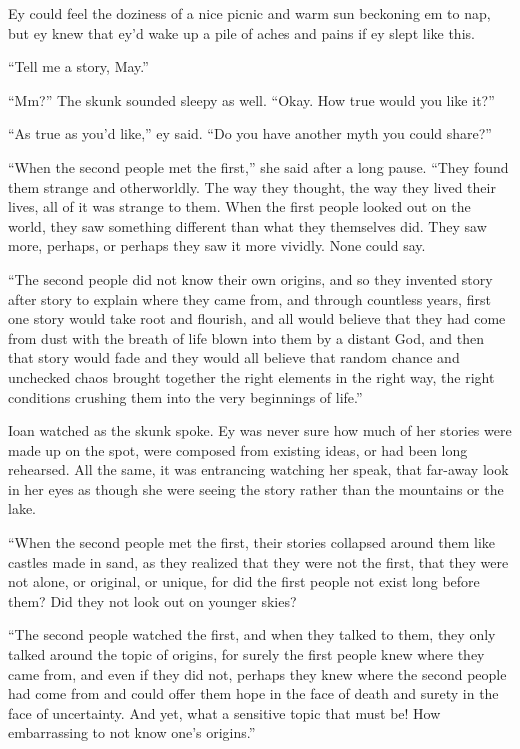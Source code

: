 Ey could feel the doziness of a nice picnic and warm sun beckoning em to nap, but ey knew that ey'd wake up a pile of aches and pains if ey slept like this.

``Tell me a story, May.''

``Mm?'' The skunk sounded sleepy as well. ``Okay. How true would you like it?''

``As true as you'd like,'' ey said. ``Do you have another myth you could share?''

``When the second people met the first,'' she said after a long pause. ``They found them strange and otherworldly. The way they thought, the way they lived their lives, all of it was strange to them. When the first people looked out on the world, they saw something different than what they themselves did. They saw more, perhaps, or perhaps they saw it more vividly. None could say.

``The second people did not know their own origins, and so they invented story after story to explain where they came from, and through countless years, first one story would take root and flourish, and all would believe that they had come from dust with the breath of life blown into them by a distant God, and then that story would fade and they would all believe that random chance and unchecked chaos brought together the right elements in the right way, the right conditions crushing them into the very beginnings of life.''

Ioan watched as the skunk spoke. Ey was never sure how much of her stories were made up on the spot, were composed from existing ideas, or had been long rehearsed. All the same, it was entrancing watching her speak, that far-away look in her eyes as though she were seeing the story rather than the mountains or the lake.

``When the second people met the first, their stories collapsed around them like castles made in sand, as they realized that they were not the first, that they were not alone, or original, or unique, for did the first people not exist long before them? Did they not look out on younger skies?

``The second people watched the first, and when they talked to them, they only talked around the topic of origins, for surely the first people knew where they came from, and even if they did not, perhaps they knew where the second people had come from and could offer them hope in the face of death and surety in the face of uncertainty. And yet, what a sensitive topic that must be! How embarrassing to not know one's origins.''

